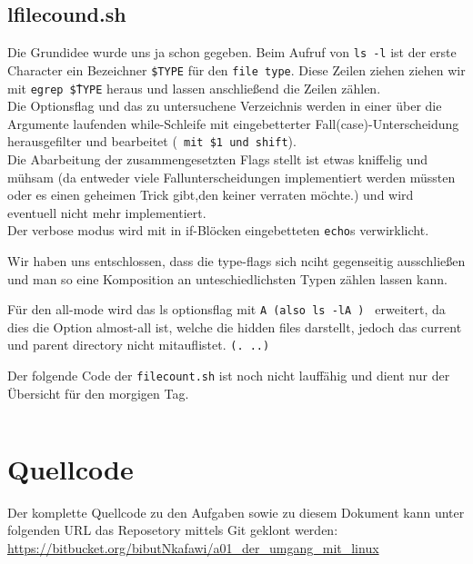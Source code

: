 \documentclass[
   draft=false
  ,paper=a4
  ,twoside=false
  ,fontsize=11pt
  ,headsepline
  ,BCOR10mm
  ,DIV11
]{scrartcl} %
\begin{document}
\subsection{lfilecound.sh}
Die Grundidee wurde uns ja schon gegeben. Beim Aufruf von \texttt{ls -l} ist
der erste Character ein Bezeichner \texttt{\$TYPE} für den \texttt{file type}.
Diese Zeilen ziehen ziehen wir mit \texttt{egrep \^\$TYPE} heraus und lassen
anschließend die Zeilen zählen. \\

Die Optionsflag und das zu untersuchene Verzeichnis werden in einer
über die Argumente laufenden while-Schleife mit eingebetterter
Fall(case)-Unterscheidung herausgefilter und bearbeitet (\texttt{ mit \$1 und
shift}).\\

Die Abarbeitung der zusammengesetzten Flags stellt ist etwas kniffelig und
mühsam (da entweder viele Fallunterscheidungen implementiert werden müssten
oder es einen geheimen Trick gibt,den keiner verraten möchte.)
und wird eventuell nicht mehr implementiert. \\

Der verbose modus wird mit in if-Blöcken eingebetteten
\texttt{echo}s verwirklicht.

Wir haben uns entschlossen, dass die type-flags sich nciht gegenseitig
ausschließen und man so eine Komposition an unteschiedlichsten Typen zählen
lassen kann.

Für den all-mode wird das ls optionsflag mit \texttt{A  (also ls -lA ) }
erweitert, da dies die Option almost-all ist, welche die hidden files darstellt,
jedoch das current und parent directory nicht mitauflistet. \texttt{(. ..)}


Der folgende Code der \texttt{filecount.sh} ist noch nicht lauffähig und dient
nur der Übersicht für den morgigen Tag.
\inputminted{bash}{lfilecound.sh}

\section{Quellcode}

Der komplette Quellcode zu den Aufgaben sowie zu diesem Dokument kann unter
folgenden URL das Reposetory mittels Git geklont werden:\\
\url{https://bitbucket.org/bibutNkafawi/a01_der_umgang_mit_linux}
\\
\end{document}
